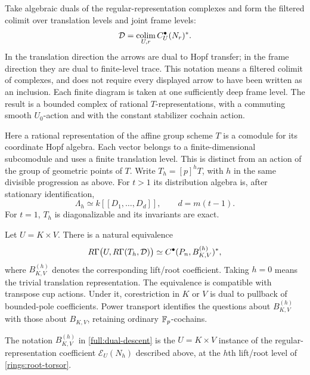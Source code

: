 Take algebraic duals of the regular-representation complexes and form
the filtered colimit over translation levels and joint frame levels:
\begin{equation}
\label{full:dual-complex}
 \mathcal D=\operatorname*{colim}_{U,r} C_U^\bullet(N_r)^*.
\end{equation}
In the translation direction the arrows are dual to Hopf transfer; in
the frame direction they are dual to finite-level trace.  This notation
means a filtered colimit of complexes, and does not require every
displayed arrow to have been written as an inclusion.  Each finite
diagram is taken at one sufficiently deep frame level.  The result is a
bounded complex of rational $T$-representations, with a commuting smooth
$U_0$-action and with the constant stabilizer cochain action.

Here a rational representation of the affine group scheme $T$ is a
comodule for its coordinate Hopf algebra.  Each vector belongs to a
finite-dimensional subcomodule and uses a finite translation level.
This is distinct from an action of the group of geometric points of
$T$.  Write $T_h=[p]^hT$, with $h$ in the same divisible progression as
above.  For $t>1$ its distribution algebra is, after stationary
identification,
\[
 \Lambda_h\simeq k[[D_1,\ldots,D_d]],\qquad d=m(t-1).
\]
For $t=1$, $T_h$ is diagonalizable and its invariants are exact.

\begin{lemma}
\label{full:trace-descent}
Let $U=K\times V$.  There is a natural equivalence
\begin{equation}
\label{full:dual-descent}
 R\Gamma\bigl(U,R\Gamma(T_h,\mathcal D)\bigr)
 \simeq C^\bullet(P_n,B_{K,V}^{(h)})^*,
\end{equation}
where $B_{K,V}^{(h)}$ denotes the corresponding lift/root coefficient.
Taking $h=0$ means the trivial translation representation.  The
equivalence is compatible with transpose cup actions.  Under it,
corestriction in $K$ or $V$ is dual to pullback of bounded-pole
coefficients.  Power transport identifies the questions about
$B_{K,V}^{(h)}$ with those about $B_{K,V}$, retaining ordinary
$\mathbb F_p$-cochains.
\end{lemma}

The notation $B_{K,V}^{(h)}$ in \eqref{full:dual-descent} is the
$U=K\times V$ instance of the regular-representation coefficient
$\mathcal E_U(N_h)$ described above, at the $h$th lift/root level of
\eqref{rings:root-torsor}.

